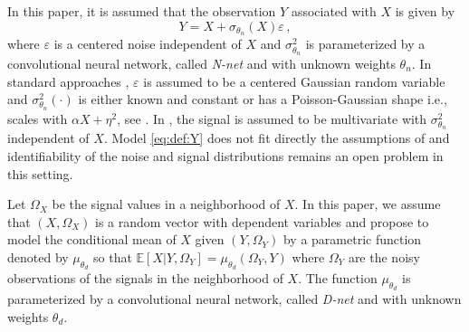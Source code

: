 \documentclass{article}
\begin{document}
In this paper, it is assumed that the observation $Y$ associated with $X$  is given by
\begin{equation}
\label{eq:def:Y}
Y = X + \sigma_{\theta_n}(X)\varepsilon\,,
\end{equation}
where $\varepsilon$ is a centered noise independent of $X$ and $\sigma^2_{\theta_n}$ is parameterized by a convolutional neural network, called \textit{N-net} and with unknown weights $\theta_n$.
In standard approaches \cite{},  $\varepsilon$ is assumed to be a centered Gaussian random variable and  $\sigma^2_{\theta_n}(\cdot)$ is either known and constant \cite{} or has a Poisson-Gaussian shape i.e., scales with $\alpha X + \eta^2$, see \cite{}.
In \cite{gassiat:lecorff:lehericy:2021}, the signal is assumed to be multivariate with  $\sigma^2_{\theta_n}$ independent of $X$. Model \eqref{eq:def:Y} does not fit directly the assumptions of \cite{gassiat:lecorff:lehericy:2021} and identifiability of the noise and signal  distributions remains an open problem in this setting.

Let  $\Omega_X$ be the signal values in a neighborhood of $X$.
In this paper, we assume that $(X,\Omega_X)$ is a random vector with dependent variables and propose to model the conditional mean of $X$ given $(Y,\Omega_Y)$ by a parametric function denoted by $\mu_{\theta_d}$ so that $\mathbb{E}[X|Y,\Omega_Y] = \mu_{\theta_d}(\Omega_Y,Y)$ where $\Omega_Y$ are the noisy observations of the signals in the neighborhood of $X$. The function $ \mu_{\theta_d}$ is parameterized by a convolutional neural network, called \textit{D-net} and with unknown weights $\theta_d$.
\end{document}
